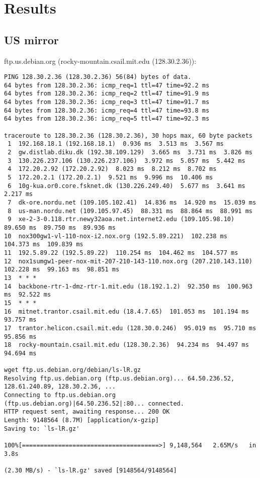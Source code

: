 \documentclass{acm_proc_article-sp}
\begin{document}
\newpage
$ $
\newpage
\appendix
\section{Results}\label{1}
\subsection{US mirror}\label{3}
ftp.us.debian.org (rocky-mountain.csail.mit.edu (128.30.2.36)):
\begin{verbatim}
PING 128.30.2.36 (128.30.2.36) 56(84) bytes of data.
64 bytes from 128.30.2.36: icmp_req=1 ttl=47 time=92.2 ms
64 bytes from 128.30.2.36: icmp_req=2 ttl=47 time=91.9 ms
64 bytes from 128.30.2.36: icmp_req=3 ttl=47 time=91.7 ms
64 bytes from 128.30.2.36: icmp_req=4 ttl=47 time=93.8 ms
64 bytes from 128.30.2.36: icmp_req=5 ttl=47 time=92.3 ms

traceroute to 128.30.2.36 (128.30.2.36), 30 hops max, 60 byte packets
 1  192.168.18.1 (192.168.18.1)  0.936 ms  3.513 ms  3.567 ms
 2  gw.distlab.diku.dk (192.38.109.129)  3.665 ms  3.731 ms  3.826 ms
 3  130.226.237.106 (130.226.237.106)  3.972 ms  5.057 ms  5.442 ms
 4  172.20.2.92 (172.20.2.92)  8.023 ms  8.212 ms  8.702 ms
 5  172.20.2.1 (172.20.2.1)  9.521 ms  9.996 ms  10.406 ms
 6  10g-kua.or0.core.fsknet.dk (130.226.249.40)  5.677 ms  3.641 ms  2.217 ms
 7  dk-ore.nordu.net (109.105.102.41)  14.836 ms  14.920 ms  15.039 ms
 8  us-man.nordu.net (109.105.97.45)  88.331 ms  88.864 ms  88.991 ms
 9  xe-2-3-0.118.rtr.newy32aoa.net.internet2.edu (109.105.98.10)  89.650 ms  89.750 ms  89.936 ms
10  nox300gw1-vl-110-nox-i2.nox.org (192.5.89.221)  102.238 ms  104.373 ms  109.839 ms
11  192.5.89.22 (192.5.89.22)  110.254 ms  104.462 ms  104.577 ms
12  nox1sumgw1-peer-nox-mit-207-210-143-110.nox.org (207.210.143.110)  102.228 ms  99.163 ms  98.851 ms
13  * * *
14  backbone-rtr-1-dmz-rtr-1.mit.edu (18.192.1.2)  92.350 ms  100.963 ms  92.522 ms
15  * * *
16  mitnet.trantor.csail.mit.edu (18.4.7.65)  101.053 ms  101.194 ms  93.757 ms
17  trantor.helicon.csail.mit.edu (128.30.0.246)  95.019 ms  95.710 ms  95.856 ms
18  rocky-mountain.csail.mit.edu (128.30.2.36)  94.234 ms  94.497 ms  94.694 ms

wget ftp.us.debian.org/debian/ls-lR.gz
Resolving ftp.us.debian.org (ftp.us.debian.org)... 64.50.236.52, 128.61.240.89, 128.30.2.36, ...
Connecting to ftp.us.debian.org (ftp.us.debian.org)|64.50.236.52|:80... connected.
HTTP request sent, awaiting response... 200 OK
Length: 9148564 (8.7M) [application/x-gzip]
Saving to: `ls-lR.gz'

100%[======================================>] 9,148,564   2.65M/s   in 3.8s    

(2.30 MB/s) - `ls-lR.gz' saved [9148564/9148564]
\end{verbatim}
\end{document}
